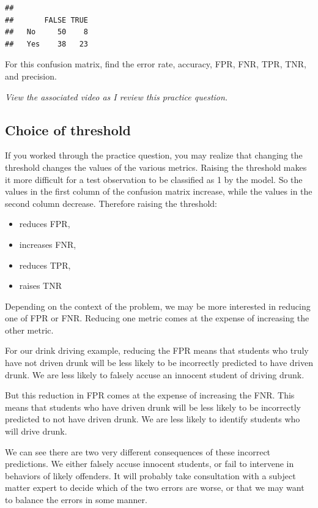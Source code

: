 \documentclass[
]{book}
\providecommand{\tightlist}{%
  \setlength{\itemsep}{0pt}\setlength{\parskip}{0pt}}
\begin{document}
\begin{verbatim}
##      
##       FALSE TRUE
##   No     50    8
##   Yes    38   23
\end{verbatim}

For this confusion matrix, find the error rate, accuracy, FPR, FNR, TPR, TNR, and precision.

\emph{View the associated video as I review this practice question.}

\hypertarget{choice-of-threshold}{%
\subsection{Choice of threshold}\label{choice-of-threshold}}

If you worked through the practice question, you may realize that changing the threshold changes the values of the various metrics. Raising the threshold makes it more difficult for a test observation to be classified as 1 by the model. So the values in the first column of the confusion matrix increase, while the values in the second column decrease. Therefore raising the threshold:

\begin{itemize}
\tightlist
\item
  reduces FPR,
\item
  increases FNR,
\item
  reduces TPR,
\item
  raises TNR
\end{itemize}

Depending on the context of the problem, we may be more interested in reducing one of FPR or FNR. Reducing one metric comes at the expense of increasing the other metric.

For our drink driving example, reducing the FPR means that students who truly have not driven drunk will be less likely to be incorrectly predicted to have driven drunk. We are less likely to falsely accuse an innocent student of driving drunk.

But this reduction in FPR comes at the expense of increasing the FNR. This means that students who have driven drunk will be less likely to be incorrectly predicted to not have driven drunk. We are less likely to identify students who will drive drunk.

We can see there are two very different consequences of these incorrect predictions. We either falsely accuse innocent students, or fail to intervene in behaviors of likely offenders. It will probably take consultation with a subject matter expert to decide which of the two errors are worse, or that we may want to balance the errors in some manner.
\end{document}
